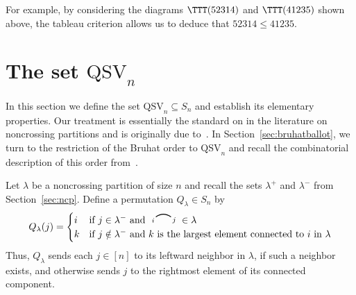 \documentclass[12pt]{amsart}
\theoremstyle{definition}
\theoremstyle{remark}
\numberwithin{equation}{section}
\newcommand{\QSV}{\mathrm{QSV}}
\newcommand{\edge}[2]{\tikz[scale = 0.75, baseline = -0.2cm]{
\draw (0.1, 0) node[inner sep = 0ex] (a) {};
\node[left, xshift = 0.1cm, yshift = -0.1cm] at (a) {$\scriptstyle #1$};
\draw (0.9, 0)  node[inner sep = 0ex] (b) {};
\node[right, xshift = -0.1cm, yshift = -0.1cm] at (b) {$\scriptstyle #2$};
\draw[thick] (a) to[out = 35, in = 145] (b);}}
\begin{document}
For example, by considering the diagrams $\TTT(52314)$ and $\TTT(41235)$ shown above, the tableau criterion allows us to deduce that $52314 \le 41235$.

\section{The set $\QSV_{n}$}
\label{sec:QSV}

In this section we define the set $\QSV_{n} \subseteq S_n$ and establish its elementary properties.  Our treatment is essentially the standard on in the literature on noncrossing partitions and is originally due to~\cite{Baine}.  In Section~\ref{sec:bruhatballot}, we turn to the restriction of the Bruhat order to $\QSV_{n}$ and recall the combinatorial description of this order from~\cite{GobetWilliams}. 

Let $\lambda$ be a noncrossing partition of size $n$ and recall the sets $\lambda^{+}$ and $\lambda^{-}$ from Section~\ref{sec:ncp}.  
Define a permutation $Q_{\lambda} \in S_{n}$ by 
\[
Q_{\lambda}(j) = \begin{cases} i & \text{if $j \in \lambda^{-}$ and $ \edge{i}{j} \in \lambda$} \\
k & \text{if $j \notin \lambda^{-}$ and $k$ is the largest element connected to $i$ in $\lambda$}
\end{cases}
\]
Thus, $Q_{\lambda}$ sends each $j \in [n]$ to its leftward neighbor in $\lambda$, if such a neighbor exists, and otherwise sends $j$ to the rightmost element of its connected component.  
\end{document}
